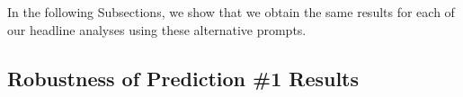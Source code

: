 In the following Subsections, we show that we obtain the same results for each of our headline analyses using these alternative prompts.




\subsection{Robustness of Prediction \#1 Results}
\label{app:gptPrompts_robustness_pred1}


